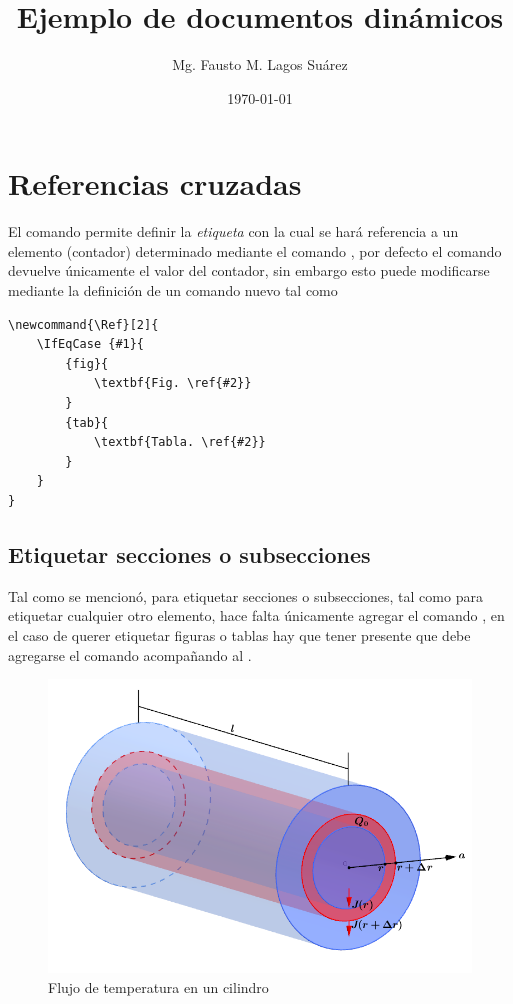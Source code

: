 \documentclass{article}
\title{Ejemplo de documentos dinámicos}
\author{Mg. Fausto M. Lagos Suárez}
\date{\today}
\begin{document}
\maketitle
\renewcommand{\contentsname}{Tabla de Contenido}
\renewcommand{\listfigurename}{Lista de Figuras}
\renewcommand{\listtablename}{Lista de Tablas}
\renewcommand{\figurename}{Fig.}
\renewcommand{\tablename}{Tabla.}
\tableofcontents
\listoffigures
\listoftables

\section{Referencias cruzadas}

El comando  permite definir la \emph{etiqueta} con la cual se hará referencia a un elemento (contador) determinado mediante el comando , por defecto el comando  devuelve únicamente el valor del contador, sin embargo esto puede modificarse mediante la definición de un comando nuevo tal como 

\begin{verbatim}
\newcommand{\Ref}[2]{
    \IfEqCase {#1}{
        {fig}{
            \textbf{Fig. \ref{#2}}
        }
        {tab}{
            \textbf{Tabla. \ref{#2}}
        }
    }
}
\end{verbatim}

\subsection{Etiquetar secciones o subsecciones} \label{etiquetas}

Tal como se mencionó, para etiquetar secciones o subsecciones, tal como para etiquetar cualquier otro elemento, hace falta únicamente agregar el comando , en el caso de querer etiquetar figuras o tablas hay que tener presente que debe agregarse el comando  acompañando al .

\begin{figure}
	\centering
	\caption{Flujo de temperatura en un cilindro} \label{cilindro}
	\includegraphics[scale=.25]{cilindro}
\end{figure}
\textcolor{gray!75}{\lipsum[1-2]}
\end{document}
